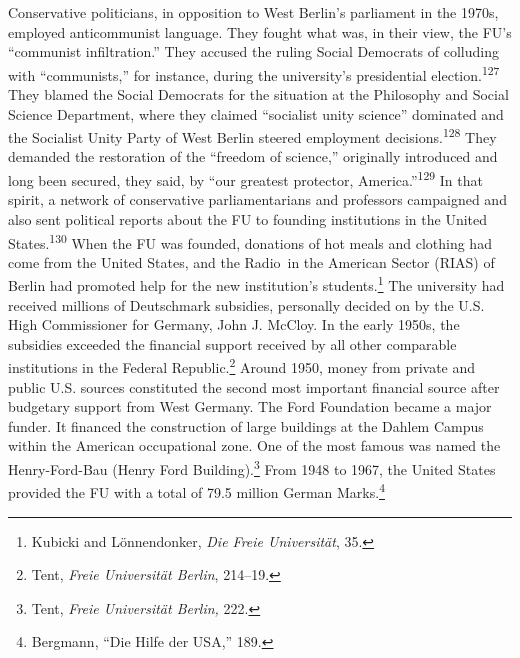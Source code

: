 \documentclass{tufte-handout}
\begin{document}
Conservative politicians, in opposition to West Berlin's parliament in
the 1970s, employed anticommunist language. They fought what was, in
their view, the FU's ``communist infiltration.'' They accused the ruling
Social Democrats of colluding with ``communists,'' for instance, during
the university's presidential election.\textsuperscript{127} They blamed the Social
Democrats for the situation at the Philosophy and Social Science
Department, where they claimed ``socialist unity science'' dominated and
the Socialist Unity Party of West Berlin steered employment
decisions.\textsuperscript{128} They demanded the restoration of the ``freedom of
science,'' originally introduced and long been secured, they said, by
``our greatest protector, America.''\textsuperscript{129} In that spirit, a network of
conservative parliamentarians and professors campaigned and also sent
political reports about the FU to founding institutions in the United
States.\textsuperscript{130} When the FU was founded, donations of hot
meals and clothing had come from the United States, and the Radio~in
the American Sector (RIAS) of Berlin had promoted help for the new
\newpage 
\noindent institution's students.\footnote{Kubicki and Lönnendonker, \emph{Die
  Freie Universität}, 35.} The university had received millions of
Deutschmark subsidies, personally decided on by the U.S. High
Commissioner for Germany, John J. McCloy. In the early 1950s, the
subsidies exceeded the financial support received by all other
comparable institutions in the Federal Republic.\footnote{Tent,
  \emph{Freie Universität Berlin}, 214--19.} Around 1950, money from
private and public U.S. sources constituted the second most important
financial source after budgetary support from West Germany. The Ford
Foundation became a major funder. It financed the construction of large
buildings at the Dahlem Campus within the American occupational zone.
One of the most famous was named the Henry-Ford-Bau (Henry Ford
Building).\footnote{Tent, \emph{Freie Universität Berlin,} 222.} From
1948 to 1967, the United States provided the FU with a total of 79.5
million German Marks.\footnote{Bergmann, ``Die Hilfe der USA,'' 189.}
\end{document}
